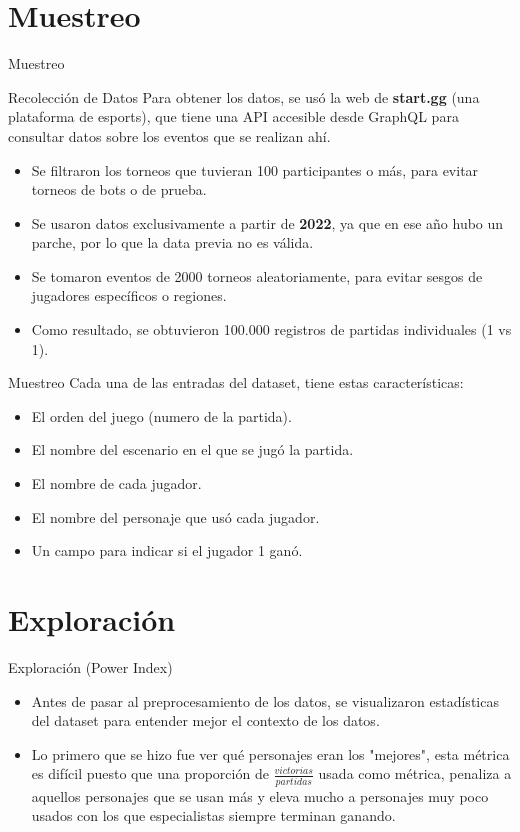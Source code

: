 \documentclass[xcolor=dvipsnames]{beamer}
\begin{document}
	\section{Muestreo}
	\begin{frame}{Muestreo}
		\begin{block}{Recolecci\'on de Datos}
			Para obtener los datos, se us\'o la web de \textbf{start.gg} (una plataforma de esports), que tiene una API accesible desde GraphQL para consultar datos sobre los eventos que se realizan ahí.
		\end{block}
		
		\begin{itemize}
			\item Se filtraron los torneos que tuvieran 100 participantes o más, para evitar torneos de bots o de prueba.
			\item Se usaron datos exclusivamente a partir de \textbf{2022}, ya que en ese año hubo un parche, por lo que la data previa no es válida.
			\item Se tomaron eventos de 2000 torneos aleatoriamente, para evitar sesgos de jugadores específicos o regiones.
			\item Como resultado, se obtuvieron 100.000 registros de partidas individuales (1 vs 1).
		\end{itemize}
	\end{frame}
	
	\begin{frame}{Muestreo}
		Cada una de las entradas del dataset, tiene estas características:
		\begin{itemize}
			\item El orden del juego (numero de la partida).
			\item El nombre del escenario en el que se jugó la partida.
			\item El nombre de cada jugador.
			\item El nombre del personaje que usó cada jugador.
			\item Un campo para indicar si el jugador 1 ganó.
		\end{itemize}
	\end{frame}
	
	\section{Exploración}
	\begin{frame}{Exploración (Power Index)}
		\begin{itemize}
			\item Antes de pasar al preprocesamiento de los datos, se visualizaron estadísticas del dataset para entender mejor el contexto de los datos.
			\item Lo primero que se hizo fue ver qué personajes eran los "mejores", esta métrica es difícil puesto que una proporción de $\frac{victorias}{partidas}$ usada como métrica, penaliza a aquellos personajes que se usan más y eleva mucho a personajes muy poco usados con los que especialistas siempre terminan ganando.
		\end{itemize}
	\end{frame}
	
\end{document}

